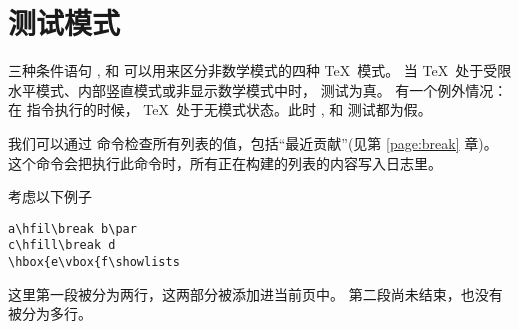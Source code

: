 \documentclass{book}
\begin{document}
\section{测试模式}

三种条件语句 ,  和  可以用来区分非数学模式的四种 \TeX\ 模式。
当 \TeX\ 处于受限水平模式、内部竖直模式或非显示数学模式中时，  测试为真。
有一个例外情况：在  指令执行的时候， \TeX\ 处于无模式状态。此时 ,  和  测试都为假。

我们可以通过 \label{showlists} 命令检查所有列表的值，包括“最近贡献”(见第 \ref{page:break} 章)。
这个命令会把执行此命令时，所有正在构建的列表的内容写入日志里。

考虑以下例子
\begin{verbatim}
a\hfil\break b\par 
c\hfill\break d
\hbox{e\vbox{f\showlists
\end{verbatim}
这里第一段被分为两行，这两部分被添加进当前页中。
第二段尚未结束，也没有被分为多行。
\end{document}
